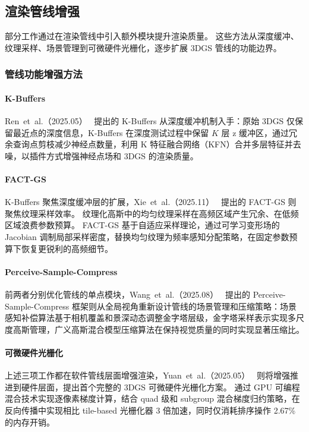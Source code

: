\subsection{渲染管线增强}

部分工作通过在渲染管线中引入额外模块提升渲染质量。
这些方法从深度缓冲、纹理采样、场景管理到可微硬件光栅化，逐步扩展 3DGS 管线的功能边界。

\subsubsection{管线功能增强方法}

\paragraph{K-Buffers}
Ren~et~al.（2025.05）~\cite{2505_19564} 提出的 K-Buffers 从深度缓冲机制入手：原始 3DGS 仅保留最近点的深度信息，K-Buffers 在深度测试过程中保留 $K$ 层 z 缓冲区，通过冗余查询点剪枝减少神经点数量，利用 K 特征融合网络（KFN）合并多层特征并去噪，以插件方式增强神经点场和 3DGS 的渲染质量。

\paragraph{FACT-GS}
K-Buffers 聚焦深度缓冲层的扩展，Xie~et~al.（2025.11）~\cite{2511_23292} 提出的 FACT-GS 则聚焦纹理采样效率。
纹理化高斯中的均匀纹理采样在高频区域产生冗余、在低频区域浪费参数预算。
FACT-GS 基于自适应采样理论，通过可学习变形场的 Jacobian 调制局部采样密度，替换均匀纹理为频率感知分配策略，在固定参数预算下恢复更锐利的高频细节。

\paragraph{Perceive-Sample-Compress}
前两者分别优化管线的单点模块，Wang~et~al.（2025.08）~\cite{2508_04965} 提出的 Perceive-Sample-Compress 框架则从全局视角重新设计管线的场景管理和压缩策略：场景感知补偿算法基于相机覆盖和景深动态调整金字塔层级，金字塔采样表示实现多尺度高斯管理，广义高斯混合模型压缩算法在保持视觉质量的同时实现显著压缩比。

\paragraph{可微硬件光栅化}
上述三项工作都在软件管线层面增强渲染，Yuan~et~al.（2025.05）~\cite{2505_18764} 则将增强推进到硬件层面，提出首个完整的 3DGS 可微硬件光栅化方案。
通过 GPU 可编程混合技术实现逐像素梯度计算，结合 quad 级和 subgroup 混合梯度归约策略，在反向传播中实现相比 tile-based 光栅化器 3 倍加速，同时仅消耗排序操作 2.67\% 的内存开销。

